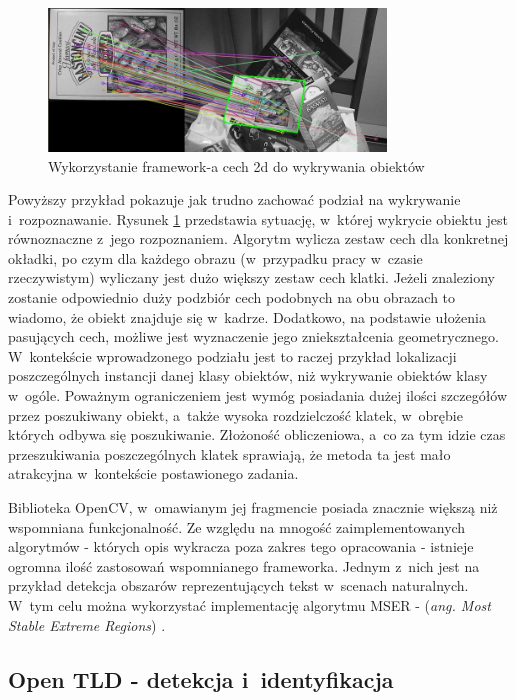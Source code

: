 \begin{figure}[h!]
  \centering
    \includegraphics[width=0.8\textwidth]{img/rev_features2d_detection}
  \caption{Wykorzystanie framework-a cech 2d do wykrywania obiektów}
  \label{fig:rev_features2d_detection}
\end{figure}

Powyższy przykład pokazuje jak trudno zachować podział na wykrywanie
i~rozpoznawanie. Rysunek \ref{fig:rev_features2d_detection}
przedstawia sytuację, w~której wykrycie obiektu jest równoznaczne
z~jego rozpoznaniem.
Algorytm wylicza zestaw cech dla konkretnej okładki, po czym dla każdego
obrazu (w~przypadku pracy w~czasie rzeczywistym) wyliczany
jest dużo większy zestaw cech klatki. Jeżeli znaleziony zostanie
odpowiednio duży podzbiór cech podobnych na obu obrazach to wiadomo,
że obiekt znajduje się w~kadrze.
Dodatkowo, na podstawie ułożenia pasujących cech, możliwe jest
wyznaczenie jego zniekształcenia geometrycznego. W~kontekście wprowadzonego
podziału jest to raczej przykład lokalizacji poszczególnych instancji danej
klasy obiektów, niż wykrywanie obiektów klasy w~ogóle.
Poważnym
ograniczeniem jest wymóg posiadania dużej ilości szczegółów przez 
poszukiwany
obiekt, a~także wysoka rozdzielczość klatek, w~obrębie których odbywa się
poszukiwanie. Złożoność obliczeniowa, a~co za tym idzie czas przeszukiwania
poszczególnych klatek sprawiają, że metoda ta jest mało atrakcyjna w~kontekście
postawionego zadania.

Biblioteka OpenCV, w~omawianym jej fragmencie posiada znacznie
większą niż wspomniana funkcjonalność.
Ze względu na mnogość zaimplementowanych algorytmów - których opis
wykracza poza zakres tego opracowania - istnieje ogromna ilość
zastosowań wspomnianego frameworka. Jednym z~nich jest na przykład
detekcja obszarów
reprezentujących tekst w~scenach naturalnych. W~tym celu
można wykorzystać implementację algorytmu MSER - (\textit{ang. Most
Stable Extreme Regions}) \cite{OCV:MSER}.

\subsection{Open TLD - detekcja i~identyfikacja}

